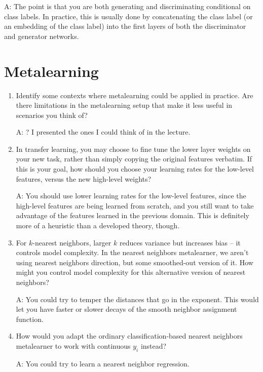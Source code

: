 \documentclass{article}
\begin{document}
A: The point is that you are both generating and discriminating conditional on
class labels. In practice, this is usually done by concatenating the class label
(or an embedding of the class label) into the first layers of both the
discriminator and generator networks.

\section{Metalearning}

\begin{enumerate}
\item Identify some contexts where metalearning could be applied in practice.
  Are there limitations in the metalearning setup that make it less useful in
  scenarios you think of?

  A: ? I presented the ones I could think of in the lecture.

\item In transfer learning, you may choose to fine tune the lower layer weights
  on your new task, rather than simply copying the original features verbatim.
  If this is your goal, how should you choose your learning rates for the
  low-level features, versus the new high-level weights?

  A: You should use lower learning rates for the low-level features, since the
  high-level features are being learned from scratch, and you still want to take
  advantage of the features learned in the previous domain. This is definitely
  more of a heuristic than a developed theory, though.

\item For $k$-nearest neighbors, larger $k$ reduces variance but increases bias
  -- it controls model complexity. In the nearest neighbors metalearner, we
  aren't using nearest neighbors direction, but some smoothed-out version of it.
  How might you control model complexity for this alternative version of nearest
  neighbors?

  A: You could try to temper the distances that go in the exponent. This would
  let you have faster or slower decays of the smooth neighbor assignment
  function.

\item How would you adapt the ordinary classification-based nearest neighbors
  metalearner to work with continuous $y_i$ instead?

  A: You could try to learn a nearest neighbor regression.

\end{enumerate}
\end{document}
